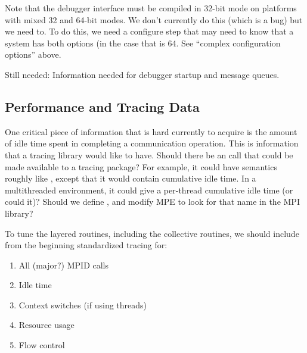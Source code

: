 \documentclass{article}
\begin{document}
Note that the debugger interface must be compiled in 32-bit mode on
platforms with mixed 32 and 64-bit modes.  We don't currently do this
(which is a bug) but we need to.  To do this, we need a configure step
that may need to know that a system has both options (in the case that
 is 64.  See ``complex configuration
options'' above.

Still needed: Information needed for debugger startup and message
queues.

\subsection{Performance and Tracing Data}
\label{sec:tracing}

One critical piece of information that is hard currently to acquire is
the amount of idle time spent in completing a communication operation.
This is information that a tracing library would like to have.  Should
there be an  call that could be made available to a tracing
package?  For example, it could have semantics roughly like
, except that it would contain cumulative idle time.  In a
multithreaded environment, it could give a per-thread cumulative idle
time (or could it)?  Should we define , and modify MPE
to look for that name in the MPI library?

To tune the layered routines, including the collective routines, we
should include from the beginning standardized tracing for:
\begin{enumerate}
\item All (major?) MPID calls
\item Idle time
\item Context switches (if using threads)
\item Resource usage
\item Flow control
\end{enumerate}


\end{document}
